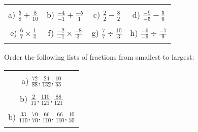 \documentclass[12pt]{article}
\begin{document}
\begin{table}[h!]
\centering
\begin{tabular}{c c c c}
\hspace{4cm} & \hspace{4cm} & \hspace{4cm} & \hspace{4cm}\\
a) $\frac{{5}}{{8}} + \frac{{8}}{{10}}$ & b) $\frac{{-4}}{{-1}} + \frac{{-5}}{{1}}$ & c) $\frac{{2}}{{2}} - \frac{{8}}{{2}}$ & d) $\frac{{-9}}{{-5}} - \frac{{5}}{{6}}$ \\ \\
e) $\frac{{6}}{{7}}\times\frac{{1}}{{4}}$ & f) $\frac{{-2}}{{-1}}\times\frac{{-8}}{{3}}$ & g) $\frac{{7}}{{7}}\div\frac{{10}}{{3}}$ & h) $\frac{{-6}}{{-9}}\div\frac{{-7}}{{9}}$ \\ \\
\end{tabular}
\end{table}
\newline
Order the following lists of fractions from smallest to largest:
\begin{table}[h!]
\centering
\begin{tabular}{c}
\hspace{4cm}\\
a) $\frac{72}{88}, \frac{24}{132}, \frac{10}{55}$\\ \\
b) $\frac{2}{11}, \frac{110}{121}, \frac{88}{121}$\\ \\
b) $\frac{33}{110}, \frac{70}{70}, \frac{66}{110}, \frac{66}{110}, \frac{10}{50}$\\ \\
\end{tabular}
\end{table}
\newline
\end{document}
